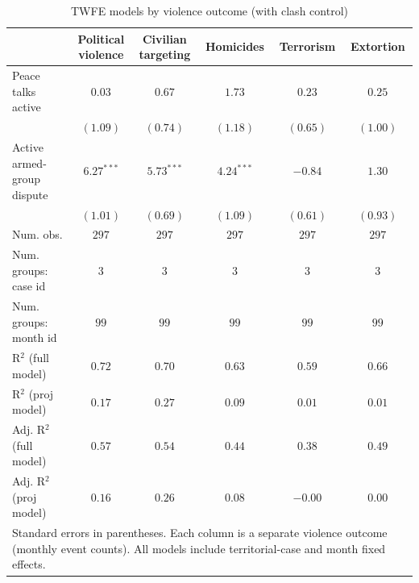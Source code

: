 
\begin{table}
\caption{TWFE models by violence outcome (with clash control)}
\begin{center}
\begin{tabular}{l c c c c c}
\toprule
 & \makecell{Political\\violence} & \makecell{Civilian\\targeting} & Homicides & Terrorism & Extortion \\
\midrule
Peace talks active         & $0.03$       & $0.67$       & $1.73$       & $0.23$   & $0.25$   \\
                           & $(1.09)$     & $(0.74)$     & $(1.18)$     & $(0.65)$ & $(1.00)$ \\
Active armed-group dispute & $6.27^{***}$ & $5.73^{***}$ & $4.24^{***}$ & $-0.84$  & $1.30$   \\
                           & $(1.01)$     & $(0.69)$     & $(1.09)$     & $(0.61)$ & $(0.93)$ \\
\midrule
Num. obs.                  & $297$        & $297$        & $297$        & $297$    & $297$    \\
Num. groups: case id      & $3$          & $3$          & $3$          & $3$      & $3$      \\
Num. groups: month id     & $99$         & $99$         & $99$         & $99$     & $99$     \\
R$^2$ (full model)         & $0.72$       & $0.70$       & $0.63$       & $0.59$   & $0.66$   \\
R$^2$ (proj model)         & $0.17$       & $0.27$       & $0.09$       & $0.01$   & $0.01$   \\
Adj. R$^2$ (full model)    & $0.57$       & $0.54$       & $0.44$       & $0.38$   & $0.49$   \\
Adj. R$^2$ (proj model)    & $0.16$       & $0.26$       & $0.08$       & $-0.00$  & $0.00$   \\
\bottomrule
\multicolumn{6}{l}{\scriptsize{Standard errors in parentheses. Each column is a separate violence outcome (monthly event counts). All models include territorial-case and month fixed effects.}}
\end{tabular}
\label{tab:violence_twfe}
\end{center}
\end{table}
